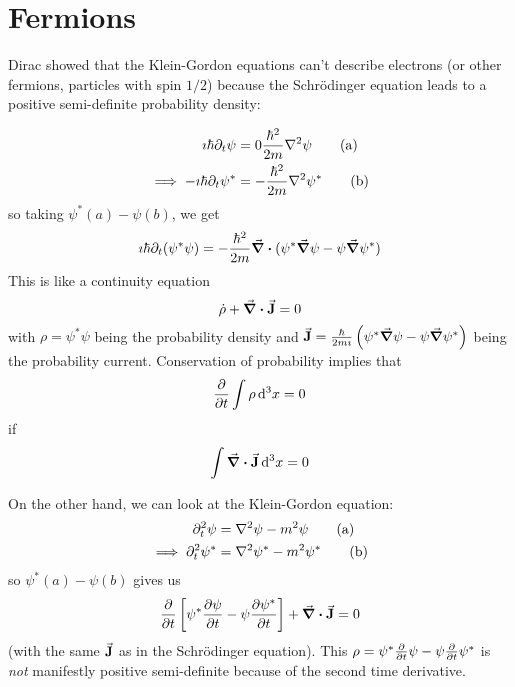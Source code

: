 \documentclass[a4paper,twoside,master.tex]{subfiles}
\begin{document}
\section{Fermions}\label{sec:fermions}

Dirac showed that the Klein-Gordon equations can't describe electrons (or other fermions, particles with spin $ 1/2 $) because the Schr\"odinger equation leads to a positive semi-definite probability density:

\begin{align}
    \imath \hbar \partial_t \psi &= 0 \frac{\hbar^2}{2m} \laplacian{\psi} \tag{a}\\
    \implies - \imath \hbar \partial_t \psi^* &= - \frac{\hbar^2}{2m} \laplacian{\psi^*} \tag{b}
\end{align}
so taking $ \psi^* (a) - \psi (b) $, we get
\begin{equation}
    \imath \hbar \partial_t (\psi^* \psi) = - \frac{\hbar^2}{2m} \div{(\psi^* \grad{\psi} - \psi \grad{\psi^*})}
\end{equation}
This is like a continuity equation
\begin{equation}
    \dot{\rho} + \div{\va{J}} = 0
\end{equation}
with $ \rho = \psi^* \psi $ being the probability density and $ \va{J} = \frac{\hbar}{2m \imath} \left( \psi^* \grad{\psi} - \psi \grad{\psi^*} \right) $ being the probability current. Conservation of probability implies that
\begin{equation}
    \pdv{t} \int \rho \dd[3]{x} = 0
\end{equation}
if
\begin{equation}
    \int \div{\va{J}} \dd[3]{x} = 0
\end{equation}

On the other hand, we can look at the Klein-Gordon equation:
\begin{align}
    \partial^2_t \psi &= \laplacian{\psi} - m^2 \psi \tag{a} \\
    \implies \partial^2_t \psi^* &= \laplacian{\psi^*} - m^2 \psi^* \tag{b}
\end{align}
so $ \psi^* (a) - \psi (b) $ gives us
\begin{equation}
    \pdv{t} \left[ \psi^* \pdv{\psi}{t} - \psi \pdv{\psi^*}{t} \right] + \div{\va{J}} = 0
\end{equation}
(with the same $ \va{J} $ as in the Schr\"odinger equation). This $ \rho = \psi^* \pdv{t} \psi - \psi \pdv{t} \psi^* $ is \textit{not} manifestly positive semi-definite because of the second time derivative.
\end{document}

